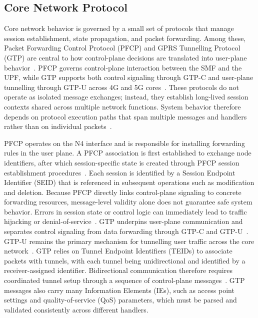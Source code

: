 \subsection{Core Network Protocol}

Core network behavior is governed by a small set of protocols that manage session establishment, state propagation, and packet forwarding. Among these, Packet Forwarding Control Protocol (PFCP) and GPRS Tunnelling Protocol (GTP) are central to how control-plane decisions are translated into user-plane behavior~\cite{3gpp29274,etsi129244}. PFCP governs control-plane interaction between the SMF and the UPF, while GTP supports both control signaling through GTP-C and user-plane tunnelling through GTP-U across 4G and 5G cores~\cite{3gpp29281,3gpp29274}. These protocols do not operate as isolated message exchanges; instead, they establish long-lived session contexts shared across multiple network functions. System behavior therefore depends on protocol execution paths that span multiple messages and handlers rather than on individual packets~\cite{zhang2025invade,akon2023formal}.

PFCP operates on the N4 interface and is responsible for installing forwarding rules in the user plane. A PFCP association is first established to exchange node identifiers, after which session-specific state is created through PFCP session establishment procedures~\cite{etsi129244}. Each session is identified by a Session Endpoint Identifier (SEID) that is referenced in subsequent operations such as modification and deletion. Because PFCP directly links control-plane signaling to concrete forwarding resources, message-level validity alone does not guarantee safe system behavior. Errors in session state or control logic can immediately lead to traffic hijacking or denial-of-service~\cite{amponis2022threatening,zhang2025invade}. GTP underpins user-plane communication and separates control signaling from data forwarding through GTP-C and GTP-U~\cite{3gpp29060,3gpp29281}. GTP-U remains the primary mechanism for tunnelling user traffic across the core network~\cite{3gpp29281,zhang2025invade}. GTP relies on Tunnel Endpoint Identifiers (TEIDs) to associate packets with tunnels, with each tunnel being unidirectional and identified by a receiver-assigned identifier. Bidirectional communication therefore requires coordinated tunnel setup through a sequence of control-plane messages~\cite{3gpp29274,3gpp29281}. GTP messages also carry many Information Elements (IEs), such as access point settings and quality-of-service (QoS) parameters, which must be parsed and validated consistently across different handlers. 

